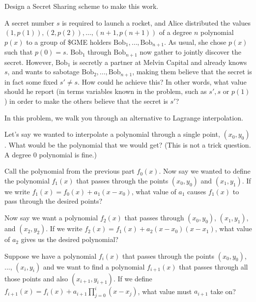\documentclass[11pt]{article}
\begin{document}
Design a Secret Sharing scheme to make this work.


A secret number $s$ is required to launch a rocket, and Alice distributed the values \\ \(\left(1,p(1)\right), \left(2,p(2)\right), \dots, \left(n+1,p(n+1)\right)\) of a degree $n$  polynomial $p(x)$ to a group of \$GME holders $\text{Bob}_1, \dots, \text{Bob}_{n+1}$. As usual, she chose $p(x)$ such that $p(0) = s$. $\text{Bob}_1$ through $\text{Bob}_{n+1}$ now gather to jointly discover the secret. However, $\text{Bob}_1$ is secretly a partner at Melvin Capital and already knows $s$, and wants to sabotage $\text{Bob}_2,\dots, \text{Bob}_{n+1}$, making them believe that the secret is in fact some fixed $s' \neq s$. How could he achieve this? In other words, what value should he report (in terms variables known in the problem, such as $s', s$ or $p(1)$) in order to make the others believe that the secret is $s'$?

In this problem, we walk you through an alternative to Lagrange interpolation.

\begin{Parts}

	\Part Let's say we wanted to interpolate a polynomial through a single point, $(x_0, y_0)$.  What would be the polynomial that we would get?  (This is not a trick question. A degree 0 polynomial is fine.)
	
	\Part Call the polynomial from the previous part $f_0(x)$.  Now say we wanted to define the polynomial $f_1(x)$ that passes through the points $(x_0, y_0)$ and $(x_1, y_1)$.  If we write $f_1(x) = f_0(x) + a_1(x - x_0)$, what value of $a_1$ causes $f_1(x)$ to pass through the desired points?
	
	\Part Now say we want a polynomial $f_2(x)$ that passes through $(x_0, y_0)$, $(x_1, y_1)$, and $(x_2, y_2)$.  If we write $f_2(x) = f_1(x) + a_2(x - x_0)(x - x_1)$, what value of $a_2$ gives us the desired polynomial?
	
	\Part Suppose we have a polynomial $f_i(x)$ that passes through the points $(x_0, y_0)$, ..., $(x_i, y_i)$ and we want to find a polynomial $f_{i + 1}(x)$ that passes through all those points and also $(x_{i + 1}, y_{i + 1})$.  If we define $f_{i + 1}(x) = f_i(x) + a_{i + 1}\prod_{j = 0}^i (x - x_j)$, what value must $a_{i + 1}$ take on?
	
	
\end{Parts}
\end{document}
